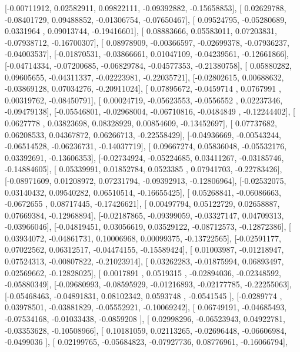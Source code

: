 \documentclass{article}
\begin{document}
       [-0.00711912,  0.02582911,  0.09822111, -0.09392882, -0.15658853],
       [ 0.02629788, -0.08401729,  0.09488852, -0.01306754, -0.07650467],
       [ 0.09524795, -0.05280689,  0.0331964 ,  0.09013744, -0.19416601],
       [ 0.08883666,  0.05583011,  0.07203831, -0.07938712, -0.16700307],
       [ 0.08978909, -0.00366597, -0.02699378, -0.07936237, -0.04003537],
       [-0.01870531, -0.03866661,  0.01047109, -0.04239561, -0.12661866],
       [-0.04714334, -0.07200685, -0.06829784, -0.04577353, -0.21380758],
       [ 0.05880282,  0.09605655, -0.04311337, -0.02223981, -0.22035721],
       [-0.02802615,  0.00688632, -0.03869128,  0.07034276, -0.20911024],
       [ 0.07895672, -0.0459714 ,  0.0767991 ,  0.00319762, -0.08450791],
       [ 0.00024719, -0.05623553, -0.0556552 ,  0.02237346, -0.09479138],
       [-0.05546801, -0.02968004, -0.06710816, -0.0484849 , -0.12244402],
       [ 0.0627778 ,  0.03823698,  0.08328929,  0.00854609, -0.13452697],
       [ 0.07737682,  0.06208533,  0.04367872,  0.06266713, -0.22558429],
       [-0.04936669, -0.00543244, -0.06514528, -0.06236731, -0.14037719],
       [ 0.09667274,  0.05836048, -0.05532176,  0.03392691, -0.13606353],
       [-0.02734924, -0.05224685,  0.03411267, -0.03185746, -0.14884605],
       [ 0.05339991,  0.01852784,  0.0523385 ,  0.07941703, -0.22783426],
       [-0.08971609,  0.01208972,  0.07231794, -0.09392913, -0.12806964],
       [-0.02532075,  0.03140432,  0.09540282,  0.06510514, -0.16655425],
       [ 0.05268841, -0.06086663, -0.0672655 ,  0.08717445, -0.17426621],
       [ 0.00497794,  0.05122729,  0.02658887,  0.07669384, -0.12968894],
       [-0.02187865, -0.09399059, -0.03327147,  0.04709313, -0.03966046],
       [-0.04819451,  0.03056619,  0.03529122, -0.08712573, -0.12872386],
       [ 0.03934072, -0.04861731,  0.10006968,  0.00099375, -0.13722565],
       [-0.02591177,  0.07022562,  0.06312517, -0.04474155, -0.15589424],
       [ 0.01003987, -0.01218947,  0.07524313, -0.00807822, -0.21023914],
       [ 0.03262283, -0.01875994,  0.06893497,  0.02569662, -0.12828025],
       [ 0.0017891 ,  0.0519315 , -0.02894036, -0.02348592, -0.05880349],
       [-0.09680993, -0.08595929, -0.01216893, -0.02177785, -0.22255063],
       [-0.05468463, -0.04891831,  0.08102342,  0.0593748 , -0.0541545 ],
       [-0.0289774 ,  0.03978501, -0.03881829, -0.05552921, -0.10069242],
       [ 0.06749191, -0.04685493, -0.07534168, -0.01033438, -0.0859208 ],
       [ 0.02998296, -0.06523943,  0.04922781, -0.03353628, -0.10508966],
       [ 0.10181059,  0.02113265, -0.02696448, -0.06606984, -0.0499036 ],
       [ 0.02199765, -0.05684823, -0.07927736,  0.08776961, -0.16066794],
\end{document}
